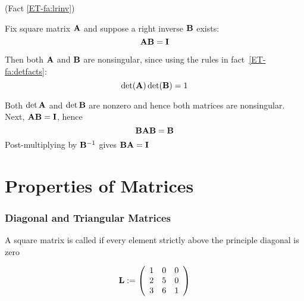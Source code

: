 \begin{frame}

    \vspace{2em}
    \Prf (Fact \ref{ET-fa:lrinv})
    
    Fix square matrix $\mathbf A$ and suppose a right
    inverse $\mathbf B$ exists: \[\mathbf A \mathbf B = \mathbf I\]
    
    Then both $\mathbf A$ and $\mathbf B$ are nonsingular,  since using the rules
    in fact~\ref{ET-fa:detfacts}: \[\det(\mathbf A) \det(\mathbf B) = 1\]
    
    Both $\det \mathbf A$ and $\det \mathbf B$ are nonzero and hence both
    matrices are nonsingular. Next, $\mathbf A \mathbf B = \mathbf I$, hence 
    \[\mathbf B \mathbf A \mathbf B = \mathbf B\]
    Post-multiplying by $\mathbf B^{-1}$ gives $\mathbf B \mathbf A = \mathbf I$
    
\end{frame}

\section{Properties of Matrices}

\begin{frame}\frametitle{Diagonal and Triangular Matrices}
    
    \vspace{2em}
    A square matrix is called  if every element strictly above the
    principle diagonal is zero
    
    \vspace{.7em}
    \Eg
    \begin{equation*}
        \label{eq:ltute}
        \mathbf L :=
        \left(
        \begin{array}{ccc}
            1 & 0 & 0  \\
            2 & 5 & 0 \\
            3 & 6 & 1
        \end{array}
        \right)
    \end{equation*}
    
\end{frame}

